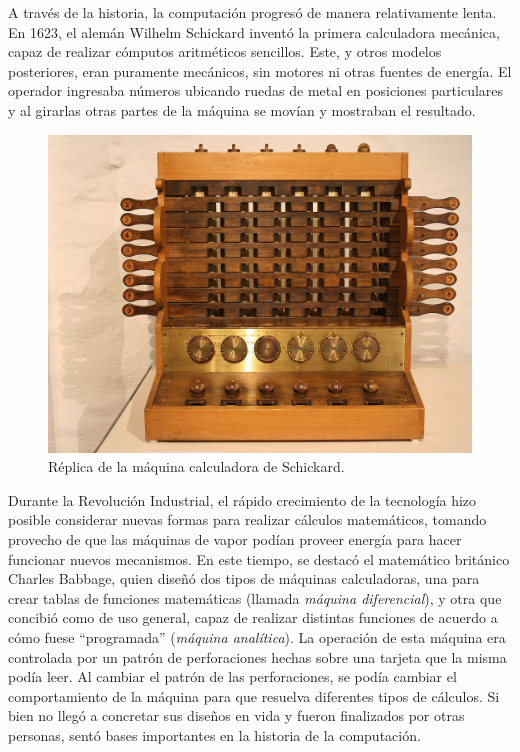 \documentclass[
]{book}
\begin{document}
A través de la historia, la computación progresó de manera relativamente lenta. En 1623, el alemán Wilhelm Schickard inventó la primera calculadora mecánica, capaz de realizar cómputos aritméticos sencillos. Este, y otros modelos posteriores, eran puramente mecánicos, sin motores ni otras fuentes de energía. El operador ingresaba números ubicando ruedas de metal en posiciones particulares y al girarlas otras partes de la máquina se movían y mostraban el resultado.

\begin{figure}

{\centering \includegraphics[width=0.5\linewidth]{images/01_calculadora} 

}

\caption{Réplica de la máquina calculadora de Schickard.}\label{fig:calculadora}
\end{figure}

Durante la Revolución Industrial, el rápido crecimiento de la tecnología hizo posible considerar nuevas formas para realizar cálculos matemáticos, tomando provecho de que las máquinas de vapor podían proveer energía para hacer funcionar nuevos mecanismos. En este tiempo, se destacó el matemático británico Charles Babbage, quien diseñó dos tipos de máquinas calculadoras, una para crear tablas de funciones matemáticas (llamada \emph{máquina diferencial}), y otra que concibió como de uso general, capaz de realizar distintas funciones de acuerdo a cómo fuese ``programada'' (\emph{máquina analítica}). La operación de esta máquina era controlada por un patrón de perforaciones hechas sobre una tarjeta que la misma podía leer. Al cambiar el patrón de las perforaciones, se podía cambiar el comportamiento de la máquina para que resuelva diferentes tipos de cálculos. Si bien no llegó a concretar sus diseños en vida y fueron finalizados por otras personas, sentó bases importantes en la historia de la computación.
\end{document}
